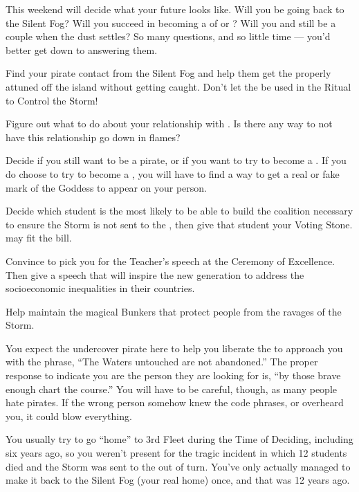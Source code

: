 \documentclass[char]{GL2020}
\begin{document}
This weekend will decide what your future looks like. Will you be going back to the Silent Fog? Will you succeed in becoming a \cPirate{\cleric} of \cEbb{} or \cFlow{}? Will you and \cPrince{} still be a couple when the dust settles? So many questions, and so little time — you'd better get down to answering them.

\begin{itemz}
    \item Find your pirate contact from the Silent Fog and help them get the properly attuned \iNet{} off the island without getting caught. Don't let the \iNet{} be used in the Ritual to Control the Storm!
    \item Figure out what to do about your relationship with \cPrince{}. Is there any way to not have this relationship go down in flames?
    \item Decide if you still want to be a pirate, or if you want to try to become a \cPirate{\cleric}. If you do choose to try to become a \cPirate{\cleric}, you will have to find a way to get a real or fake mark of the Goddess to appear on your person.
     \item Decide which \pShippie{} student is the most likely to be able to build the coalition necessary to ensure the Storm is not sent to the \pShip{}, then give that student your Voting Stone. \cWarlordDaughter{} may fit the bill.
    \item Convince \cMusic{} to pick you for the Teacher's speech at the Ceremony of Excellence. Then give a speech that will inspire the new generation to address the socioeconomic inequalities in their countries.
    \item Help \cBunker{} maintain the magical Bunkers that protect people from the ravages of the Storm.
\end{itemz}

\begin{itemz}[Notes]
    \item You expect the undercover pirate here to help you liberate the \iNet{} to approach you with the phrase, ``The Waters untouched are not abandoned.'' The proper response to indicate you are the person they are looking for is, ``by those brave enough chart the course.'' You will have to be careful, though, as many people hate pirates. If the wrong person somehow knew the code phrases, or overheard you, it could blow everything.
    \item You usually try to go ``home'' to 3rd Fleet during the Time of Deciding, including six years ago, so you weren't present for the tragic incident in which 12 students died and the Storm was sent to the \pShip{} out of turn. You've only actually managed to make it back to the Silent Fog (your real home) once, and that was 12 years ago.
\end{itemz}
\end{document}
